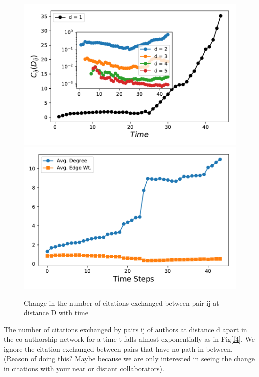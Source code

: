 \documentclass[aps, pre, twocolumn, nofootinbib]{revtex4-1}
\begin{document}
\begin{figure}
	\centering

	\includegraphics[scale = 0.49]{plots/fig2}
	\includegraphics[scale = 0.49]{plots/fig3}
	\captionsetup{singlelinecheck=false, justification=raggedright,  labelsep=space}
	
	\caption{Change in the number of citations exchanged between pair ij at distance D with time}
	\label{f4a}
\end{figure}

The number of citations exchanged by pairs ij of authors at distance d apart in the co-authorship network for a time t falls almost exponentially as in Fig\ref{f4}. We ignore the citation exchanged between pairs that have no path in between.(Reason of doing this? Maybe because we are only interested in seeing the change in citations with your near or distant collaborators).
\end{document}
